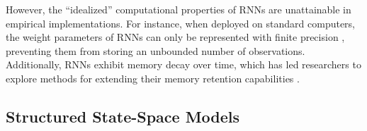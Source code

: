 \documentclass[10pt,letterpaper]{article}
\begin{document}
However, the ``idealized'' computational properties of RNNs are unattainable in empirical implementations.
For instance, when deployed on standard computers, the weight parameters of RNNs can only be represented with finite precision \citep[][]{Chen+18_RNN,Weiss+RNN_formal_language}, preventing them from storing an unbounded number of observations.
Additionally, RNNs exhibit memory decay over time, which has led researchers to explore methods for extending their memory retention capabilities \citep{HochreiterSchmidhuber97_LSTM,Arjovsky+16,Neil+16,Chang+17,Jing+17,Jing+19}.





\subsection{Structured State-Space Models}
\end{document}
